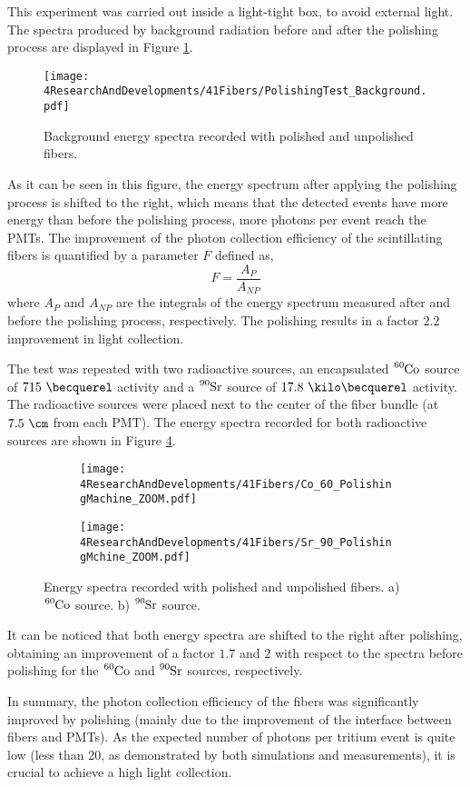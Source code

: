 This experiment was carried out inside a light-tight box, to avoid external light. The spectra produced by background radiation before and after the polishing process are displayed in Figure \ref{fig:ResultsOfPolishingMachineBackground}.
\begin{figure}[]
\centering
\texttt{[image: 4ResearchAndDevelopments/41Fibers/PolishingTest\_Background.pdf]}
\caption{Background energy spectra recorded with polished and unpolished fibers.\label{fig:ResultsOfPolishingMachineBackground}}
\end{figure}
As it can be seen in this figure, the energy spectrum after applying the polishing process is shifted to the right, which means that the detected events have more energy than before the polishing process, more photons per event reach the PMTs. The improvement of the photon collection efficiency of the scintillating fibers is quantified by a parameter $F$ defined as,
\begin{equation}
F=\frac{A_{P}}{A_{NP}}
\label{eq:RelativeImprovement}
\end{equation}
where $A_{P}$ and $A_{NP}$ are the integrals of the energy spectrum measured after and before the polishing process, respectively. The polishing results in a factor $2.2$ improvement in light collection. 

The test was repeated with two radioactive sources, an encapsulated $\ce{^{60}Co}$ source of $715~\becquerel$ activity and a $\ce{^{90}Sr}$ source of $17.8~\kilo\becquerel$ activity. The radioactive sources were placed next to the center of the fiber bundle (at $7.5~\cm$ from each PMT). The energy spectra recorded for both radioactive sources are shown in Figure \ref{fig:ResultsOfPolishingMachineSources}.
\begin{figure}
\centering
    \begin{subfigure}[b]{1\textwidth}
    \centering
    \texttt{[image: 4ResearchAndDevelopments/41Fibers/Co\_60\_PolishingMachine\_ZOOM.pdf]}  
    \caption{\label{subfig:EnergySpectrumCo60PolishingTest}}
    \end{subfigure}
    \hfill
    \begin{subfigure}[b]{1\textwidth}
    \centering
    \texttt{[image: 4ResearchAndDevelopments/41Fibers/Sr\_90\_PolishingMchine\_ZOOM.pdf]}  
    \caption{\label{subfig:EnergySpectrumSr90PolishingTest}}
    \end{subfigure}
 \caption{Energy spectra recorded with polished and unpolished fibers. a) $\ce{^{60}Co}$ source. b) $\ce{^{90}Sr}$ source.}
 \label{fig:ResultsOfPolishingMachineSources}
\end{figure}
It can be noticed that both energy spectra are shifted to the right after polishing, obtaining an improvement of a factor $1.7$ and $2$ with respect to the spectra before polishing for the $\ce{^{60}Co}$ and $\ce{^{90}Sr}$ sources, respectively. 

In summary, the photon collection efficiency of the fibers was significantly improved by polishing (mainly due to the improvement of the interface between fibers and PMTs). As the expected number of photons per tritium event is quite low (less than 20, as demonstrated by both simulations and measurements), it is crucial to achieve a high light collection.